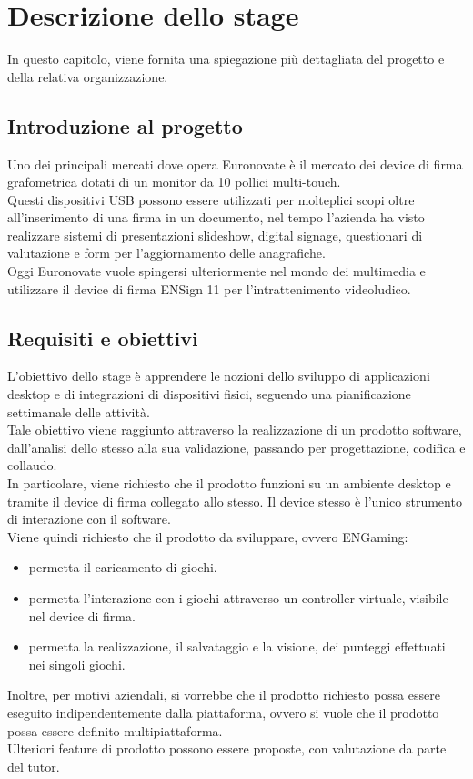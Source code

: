\chapter{Descrizione dello stage}
\label{cap:descrizione-stage}

In questo capitolo, viene fornita una spiegazione più dettagliata del progetto e della relativa organizzazione.

\section{Introduzione al progetto}

Uno dei principali mercati dove opera Euronovate è il mercato dei device di firma grafometrica
dotati di un monitor da 10 pollici multi-touch.\\ Questi dispositivi USB possono essere utilizzati
per molteplici scopi oltre all'inserimento di una firma in un documento, nel tempo l'azienda ha visto
realizzare sistemi di presentazioni slideshow, digital signage, questionari di valutazione e form
per l'aggiornamento delle anagrafiche.\\ Oggi Euronovate vuole spingersi ulteriormente nel mondo dei
multimedia e utilizzare il device di firma ENSign 11 per l'intrattenimento videoludico.\\

\section{Requisiti e obiettivi}

L'obiettivo dello stage è apprendere le nozioni dello sviluppo di applicazioni desktop e di integrazioni di dispositivi fisici, seguendo una pianificazione
settimanale delle attività.\\
Tale obiettivo viene raggiunto attraverso la realizzazione di un prodotto software, dall'analisi dello stesso alla sua validazione, passando per progettazione, codifica e collaudo.\\
In particolare, viene richiesto che il prodotto funzioni su un ambiente desktop e tramite il device di firma collegato allo stesso. Il device stesso è l'unico strumento di interazione con il software.\\
Viene quindi richiesto che il prodotto da sviluppare, ovvero ENGaming:
\begin{itemize}
    \item permetta il caricamento di giochi.
    \item permetta l'interazione con i giochi attraverso un controller virtuale, visibile nel device di firma.
    \item permetta la realizzazione, il salvataggio e la visione, dei punteggi effettuati nei singoli giochi.
\end{itemize}
Inoltre, per motivi aziendali, si vorrebbe che il prodotto richiesto possa essere eseguito indipendentemente dalla piattaforma, ovvero si vuole che il prodotto possa essere definito multipiattaforma.\\
Ulteriori feature di prodotto possono essere proposte, con valutazione da parte del tutor.


